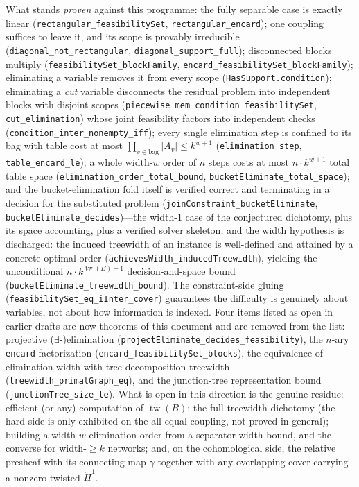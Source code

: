 \documentclass[11pt]{article}
\newcommand{\lean}[1]{\texttt{#1}}
\begin{document}
What stands \emph{proven} against this programme: the fully separable
case is exactly linear (\lean{rectangular\_feasibilitySet},
\lean{rectangular\_encard}); one coupling suffices to leave it, and
its scope is provably irreducible (\lean{diagonal\_not\_rectangular},
\lean{diagonal\_support\_full}); disconnected blocks multiply
(\lean{feasibilitySet\_blockFamily},
\lean{encard\_feasibilitySet\_blockFamily}); eliminating a variable
removes it from every scope (\lean{HasSupport.condition}); eliminating
a \emph{cut} variable disconnects the residual problem into
independent blocks with disjoint scopes
(\lean{piecewise\_mem\_condition\_feasibilitySet},
\lean{cut\_elimination}) whose joint feasibility factors into
independent checks (\lean{condition\_inter\_nonempty\_iff}); every
single elimination step is confined to its bag with table cost at most
$\prod_{v \in \mathrm{bag}} |A_v| \le k^{w+1}$
(\lean{elimination\_step}, \lean{table\_encard\_le}); a whole
width-$w$ order of $n$ steps costs at most $n \cdot k^{w+1}$ total
table space (\lean{elimination\_order\_total\_bound},
\lean{bucketEliminate\_total\_space}); and the bucket-elimination fold
itself is verified correct and terminating in a decision for the
substituted problem (\lean{joinConstraint\_bucketEliminate},
\lean{bucketEliminate\_decides})---the width-$1$ case of the
conjectured dichotomy, plus its space accounting, plus a verified
solver skeleton; and the width hypothesis is discharged: the induced
treewidth of an instance is well-defined and attained by a concrete
optimal order (\lean{achievesWidth\_inducedTreewidth}), yielding the
unconditional $n \cdot k^{\operatorname{tw}(B)+1}$ decision-and-space
bound (\lean{bucketEliminate\_treewidth\_bound}).  The
constraint-side gluing (\lean{feasibilitySet\_eq\_iInter\_cover})
guarantees the difficulty is genuinely about variables, not about how
information is indexed.  Four items listed as open in earlier drafts
are now theorems of this document and are removed from the list:
projective ($\exists$-)elimination
(\lean{projectEliminate\_decides\_feasibility}), the $n$-ary
\lean{encard} factorization (\lean{encard\_feasibilitySet\_blocks}),
the equivalence of elimination width with tree-decomposition treewidth
(\lean{treewidth\_primalGraph\_eq}), and the junction-tree
representation bound (\lean{junctionTree\_size\_le}).  What is open in
this direction is the genuine residue: efficient (or any) computation of
$\operatorname{tw}(B)$; the full treewidth dichotomy (the hard side is
only exhibited on the all-equal coupling, not proved in general);
building a width-$w$ elimination order from a separator width bound, and
the converse for width-$\ge k$ networks; and, on the cohomological side,
the relative presheaf with its connecting map $\gamma$ together with any
overlapping cover carrying a nonzero twisted $\check{H}^1$.



\end{document}
